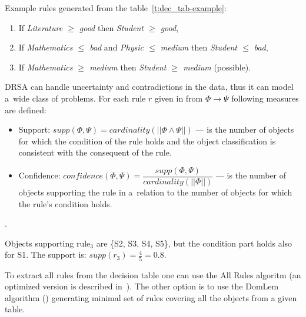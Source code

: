 Example rules generated from the table~\ref{t:dec_tab-example}:
\begin{enumerate}
\item If \textit{Literature $\ge$ good} then \textit{Student $\ge$ good},
\item If \textit{Mathematics $\le$ bad} and \textit{Physic $\le$ medium} then
  \textit{Student $\le$ bad},
\item If \textit{Mathematics $\ge$ medium} then \textit{Student $\ge$ medium}
  (possible).
\end{enumerate}

DRSA can handle uncertainty and contradictions in the data, thus it can model
a~wide class of problems. For each rule $r$ given in from $\Phi \to \Psi$
following measures are defined:
\begin{itemize}
\item Support: $\textit{supp}(\Phi, \Psi) = \textit{cardinality}(||\Phi \land
  \Psi||)$ --- is the number of objects for which the condition of the rule
  holds and the object classification is consistent with the consequent of the
  rule.
\item Confidence: $\textit{confidence}(\Phi, \Psi) =
  \dfrac{\textit{supp}(\Phi, \Psi)}{\textit{cardinality}(||\Phi||)}$ --- is
  the number of objects supporting the rule in a~relation to the number of
  objects for which the rule's condition holds.
\end{itemize}.

Objects supporting rule$_3$ are \{S2, S3, S4, S5\}, but the condition part
holds also for S1. The support is: $\textit{supp}(r_3) = \frac{4}{5} = 0.8$.

To extract all rules from the decision table one can use the All Rules
algoritm (an optimized version is described in~\cite{Zur01}). The other option
is to use the DomLem algorithm (\cite{GMS+01}) generating minimal set of rules
covering all the objects from a given table.


